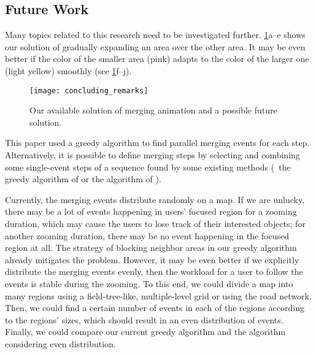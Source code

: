 \documentclass[]{interact}
\begin{document}
\subsection{Future Work}

Many topics related to this research need to be investigated further.
\fig\ref{fig:smooth_merging}a--e shows our solution of
gradually expanding an area over the other area.
It may be even better if the color of the smaller area (pink)
adapts to the color of the larger one (light yellow) smoothly
(see \fig\ref{fig:smooth_merging}f--j).


\begin{figure}[tb]
\centering
\texttt{[image: concluding\_remarks]}
\caption{
    Our available solution of merging animation 
    and a possible future solution.}
\label{fig:smooth_merging}
\end{figure}







This paper used a greedy algorithm 
to find parallel merging events for each step.
Alternatively, it is possible to define merging steps 
by selecting and combining some single-event steps of a sequence found 
by some existing methods
(\eg~the greedy algorithm of \citet{vanOosterom2005}
or the \Astar algorithm of \citet[]{Peng2019Thesis}).

Currently, the merging events distribute randomly on a map.
If we are unlucky, there may be a lot of events 
happening in users' focused region for a zooming duration,
which may cause the users to lose track of their interested objects;
for another zooming duration, 
there may be no event happening in the focused region at all.
The strategy of blocking neighbor areas in our greedy algorithm 
already mitigates the problem.
However, it may be even better if 
we explicitly distribute the merging events evenly, 
then the workload for a user to follow the events is stable during the zooming.
To this end, we could divide a map into many regions 
using a field-tree-like, multiple-level grid \citep{vanPutten1998NewGAP}
or using the road network.
Then, we could find a certain number of events in each of the regions 
according to the regions' sizes,
which should result in an even distribution of events.
Finally, we could compare our current greedy algorithm and 
the algorithm considering even distribution.
\end{document}
